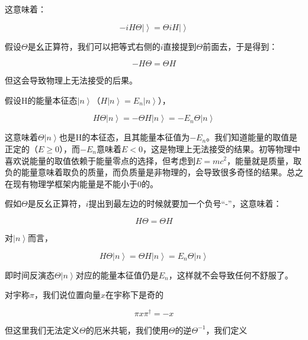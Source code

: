 这意味着：

\begin{equation}
- i H \Theta \left| {} \right\rangle  = \Theta i H \left| {} \right\rangle
\end{equation}

假设$\Theta$是幺正算符，我们可以把等式右侧的$i$直接提到$\Theta$前面去，于是得到：

\begin{equation}
- H \Theta = \Theta H
\end{equation}

但这会导致物理上无法接受的后果。

假设H的能量本征态$\left| n \right\rangle$（$H \left| n \right\rangle = E_n \left| n \right\rangle$），

\begin{equation}
H \Theta \left| n \right\rangle = - \Theta H \left| n \right\rangle = - E_n \Theta \left| n \right\rangle
\end{equation}

这意味着$\Theta \left| n \right\rangle$也是H的本征态，且其能量本征值为$- E_n$。我们知道能量的取值是正定的（$E \ge 0$），而$- E_n$意味着$E < 0$，这是物理上无法接受的结果。初等物理中喜欢说能量的取值依赖于能量零点的选择，但考虑到$E = m c^2$，能量就是质量，取负的能量意味着取负的质量，而负质量是非物理的，会导致很多奇怪的结果。总之在现有物理学框架内能量是不能小于0的。

假如$\Theta$是反幺正算符，$i$提出到最左边的时候就要加一个负号“-”，这意味着：

\begin{equation}
H \Theta = \Theta H
\end{equation}

对$\left| n \right\rangle$而言，

\begin{equation}
H \Theta \left| n \right\rangle = \Theta H \left| n \right\rangle = E_n \Theta \left| n \right\rangle
\end{equation}

即时间反演态$\Theta \left| n \right\rangle$对应的能量本征值仍是$E_n$，这样就不会导致任何不舒服了。

对宇称$\pi$，我们说位置向量$x$在宇称下是奇的

\begin{equation}
\pi x \pi^\dagger = - x
\end{equation}

但这里我们无法定义$\Theta$的厄米共轭，我们使用$\Theta$的逆$\Theta^{-1}$，我们定义

